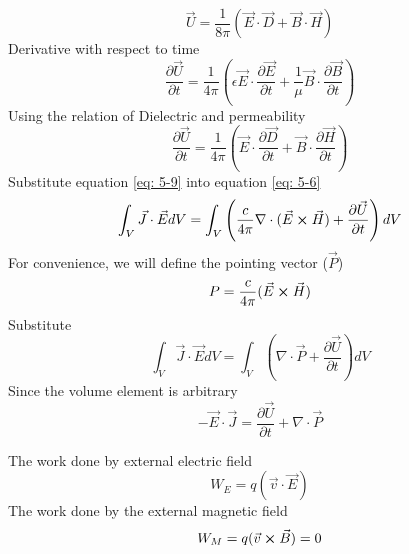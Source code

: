 \documentclass[12pt]{article}
\begin{document}
    \begin{equation} \label{eq: 5-7}
        \vec{U} = \frac{1}{8 \pi} (\vec{E} \cdot \vec{D} + \vec{B} \cdot \vec{H})
    \end{equation}
    Derivative with respect to time
    \begin{equation} \label{eq: 5-8}
        \frac{\partial \vec{U}}{\partial t} = \frac{1}{4 \pi} \left(\epsilon \vec{E} \cdot \frac{\partial \vec{E}}{\partial t} + \frac{1}{\mu} \vec{B} \cdot \frac{\partial \vec{B}}{\partial t} \right)
    \end{equation}
    Using the relation of Dielectric and permeability
    \begin{equation} \label{eq: 5-9}
        \frac{\partial \vec{U}}{\partial t} = \frac{1}{4 \pi} \left(\vec{E} \cdot \frac{\partial \vec{D}}{\partial t} + \vec{B} \cdot \frac{\partial \vec{H}}{\partial t} \right)
    \end{equation}
    Substitute equation \ref{eq: 5-9} into equation \ref{eq: 5-6}
    \begin{equation} \label{eq: 5-10}
        \int_V \vec{J} \cdot \vec{E} dV = \int_V \left(\frac{c}{4\pi} \nabla \cdot (\vec{E} \cross \vec{H}) + \frac{\partial \vec{U}}{\partial t}\right)  dV 
    \end{equation}
    For convenience, we will define the pointing vector ($\vec{P}$)
    \begin{equation} \label{eq: 5-11}
        P = \frac{c}{4 \pi} (\vec{E} \cross \vec{H})
    \end{equation}
    Substitute
    \begin{equation} \label{eq: 5-12}
        \int_V \vec{J} \cdot \vec{E} dV = \int_V \left(\nabla \cdot \vec{P} + \frac{\partial \vec{U}}{\partial t}\right)  dV 
    \end{equation}
    Since the volume element is arbitrary
    \begin{equation} \label{eq: 5-13}
        - \vec{E} \cdot \vec{J} = \frac{\partial \vec{U}}{\partial t} + \nabla \cdot \vec{P}
    \end{equation}
    
    
    
    
    
    
    
    The work done by external electric field
    \begin{equation} \label{eq: 5-2}
        W_E = q (\vec{v} \cdot \vec{E})
    \end{equation}
    The work done by the external magnetic field
    \begin{equation} \label{eq: 5-3}
        W_M = q (\vec{v} \cross \vec{B}) = 0 
    \end{equation}
\end{document}
